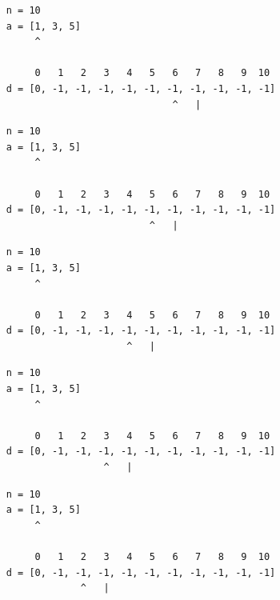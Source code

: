 \begin{frame}[fragile]
\begin{verbatim}
     n = 10
     a = [1, 3, 5]
          ^

          0   1   2   3   4   5   6   7   8   9  10
     d = [0, -1, -1, -1, -1, -1, -1, -1, -1, -1, -1]
                                  ^   |
\end{verbatim}
\end{frame}
\addtocounter{framenumber}{-1}

\begin{frame}[fragile]
\begin{verbatim}
     n = 10
     a = [1, 3, 5]
          ^

          0   1   2   3   4   5   6   7   8   9  10
     d = [0, -1, -1, -1, -1, -1, -1, -1, -1, -1, -1]
                              ^   |
\end{verbatim}
\end{frame}
\addtocounter{framenumber}{-1}

\begin{frame}[fragile]
\begin{verbatim}
     n = 10
     a = [1, 3, 5]
          ^

          0   1   2   3   4   5   6   7   8   9  10
     d = [0, -1, -1, -1, -1, -1, -1, -1, -1, -1, -1]
                          ^   |
\end{verbatim}
\end{frame}
\addtocounter{framenumber}{-1}

\begin{frame}[fragile]
\begin{verbatim}
     n = 10
     a = [1, 3, 5]
          ^

          0   1   2   3   4   5   6   7   8   9  10
     d = [0, -1, -1, -1, -1, -1, -1, -1, -1, -1, -1]
                      ^   |
\end{verbatim}
\end{frame}
\addtocounter{framenumber}{-1}

\begin{frame}[fragile]
\begin{verbatim}
     n = 10
     a = [1, 3, 5]
          ^

          0   1   2   3   4   5   6   7   8   9  10
     d = [0, -1, -1, -1, -1, -1, -1, -1, -1, -1, -1]
                  ^   |
\end{verbatim}
\end{frame}
\addtocounter{framenumber}{-1}

